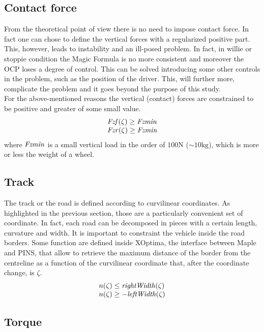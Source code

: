 \subsection{Contact force}
%
From the theoretical point of view there is no need to impose contact force. In fact one can chose to define the vertical forces with a regularized positive part. This, however, leads to instability and an ill-posed problem. In fact, in willie or stoppie condition the Magic Formula is no more consistent and moreover the OCP loses a degree of control. This can be solved introducing some other controls in the problem, such as the position of the driver. This, will further more, complicate the problem and it goes beyond the purpose of this study.\\
For the above-mentioned reasons the vertical (contact) forces are constrained to be positive and greater of some small value.
%
\begin{equation}
    \begin{array}{l}
        {\it Fzf}(\zeta) \ge {\it Fzmin}\\
        {\it Fzr}(\zeta) \ge {\it Fzmin}\\
    \end{array}
\end{equation}
%
where ${\it Fzmin}$ is a small vertical load in the order of $100 \si{\newton}$ ($\sim 10 \si{\kilogram}$), which is more or less the weight of a wheel.



\subsection{Track}
%
The track or the road is defined according to curvilinear coordinates. As highlighted in the previous section, those are a particularly convenient set of coordinate. In fact, each road can be decomposed in pieces with a certain length, curvature and width. It is important to constraint the vehicle inside the road borders. Some function are defined inside XOptima, the interface between Maple and PINS, that allow to retrieve the maximum distance of the border from the centreline as a function of the curvilinear coordinate that, after the coordinate change, is $\zeta$.
%
\begin{equation}
    \begin{array}{l}
        n(\zeta) \le  {\it rightWidth}(\zeta)\\
        n(\zeta) \ge -{\it leftWidth}(\zeta)
    \end{array}
\end{equation}
%


%
\subsection{Torque}
%


